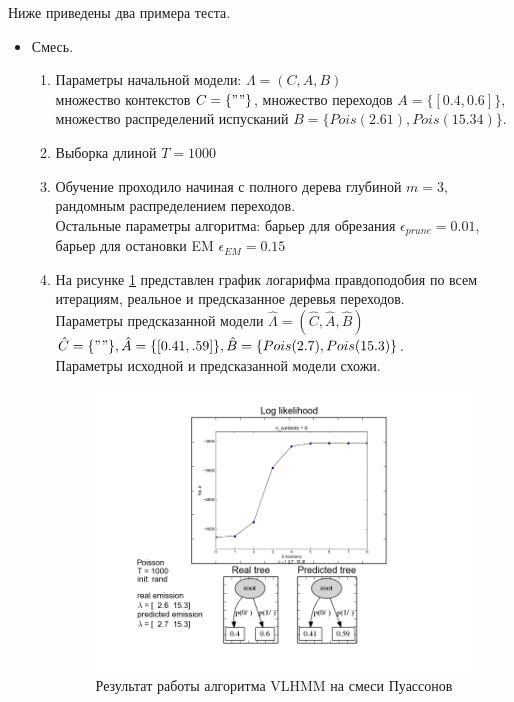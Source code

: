 \documentclass{matmex-diploma-custom}
\begin{document}
Ниже приведены два примера теста.
\begin{itemize}
\item Смесь.
\begin{enumerate}
\item Параметры начальной модели: $\Lambda = (C, A, B)$ 
\\множество контекстов $C = \{""\}$, множество переходов $A = \{[0.4, 0.6]\}$, множество распределений испусканий $B = \{Pois(2.61), Pois(15.34)\}$. 
\item Выборка длиной $ T = 1000 $
\item Обучение проходило начиная с полного дерева глубиной $ m  = 3$, рандомным распределением переходов. 
\\Остальные параметры алгоритма: барьер для обрезания $ \epsilon_{prune} = 0.01$, барьер для остановки EM $ \epsilon_{EM} =  0.15 $      
\item На рисунке \ref{ris:img_mixture_main} представлен график логарифма правдоподобия по всем итерациям, реальное и предсказанное деревья переходов.
\\Параметры предсказанной модели $\hat{\Lambda} = (\hat{C}, \hat{A}, \hat{B})$  
\\$\hat{C} = \{""\}, \hat{A} = \{[0.41, .59]\}, \hat{B} = \{Pois(2.7), Pois(15.3)\}$.
\\Параметры исходной и предсказанной модели схожи.
\begin{figure}[ht]\centering
	\includegraphics[scale=0.5]{img/sample_mixture/main.png}
	\centering
	\caption{Результат работы алгоритма VLHMM на смеси Пуассонов}
	\label{ris:img_mixture_main}
\end{figure}

\end{enumerate}
\end{itemize}
\end{document}
